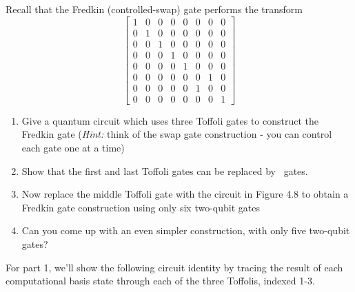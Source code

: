  Recall that the Fredkin (controlled-swap) gate performs the transform
$$\begin{bmatrix}
1 & 0 & 0 & 0 & 0 & 0 & 0 & 0 \\
0 & 1 & 0 & 0 & 0 & 0 & 0 & 0 \\
0 & 0 & 1 & 0 & 0 & 0 & 0 & 0 \\
0 & 0 & 0 & 1 & 0 & 0 & 0 & 0 \\
0 & 0 & 0 & 0 & 1 & 0 & 0 & 0 \\
0 & 0 & 0 & 0 & 0 & 0 & 1 & 0 \\
0 & 0 & 0 & 0 & 0 & 1 & 0 & 0 \\
0 & 0 & 0 & 0 & 0 & 0 & 0 & 1 
\end{bmatrix}$$
\begin{enumerate}
\item Give a quantum circuit which uses three Toffoli gates to construct the Fredkin gate (\textit{Hint:} think of the swap gate construction - you can control each gate one at a time)
\item Show that the first and last Toffoli gates can be replaced by \CNOT\ gates.
\item Now replace the middle Toffoli gate with the circuit in Figure 4.8 to obtain a Fredkin gate construction using only six two-qubit gates
\item Can you come up with an even simpler construction, with only five two-qubit gates?
\end{enumerate}
\vspace{-15pt}
\Soln For part 1, we'll show the following circuit identity by tracing the result of each computational basis state through each of the three Toffolis, indexed 1-3.
